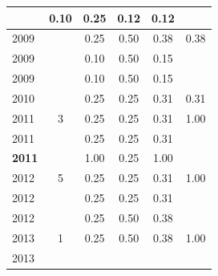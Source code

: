 \begin{table}[H]
\begin{tabular}{| l | c | c | c | c | c |}
          &
          0.10
          &
          0.25
          &
          0.12
          &
            {\color{red} 0.12}
          \\
\hline
            2009
          &
          
          &
          0.25
          &
          0.50
          &
          0.38
          &
            {\color{red} 0.38}
          \\
            2009
          &
          
          &
          0.10
          &
          0.50
          &
          0.15
          &
          \\
            2009
          &
          
          &
          0.10
          &
          0.50
          &
          0.15
          &
          \\
\hline
            2010
          &
          
          &
          0.25
          &
          0.25
          &
          0.31
          &
            {\color{red} 0.31}
          \\
\hline
            2011
          &
          3
          &
          0.25
          &
          0.25
          &
          0.31
          &
            {\color{blue} 1.00}
          \\
            2011
          &
          
          &
          0.25
          &
          0.25
          &
          0.31
          &
          \\
            {\bf 2011}
          &
          
          &
          1.00
          &
          0.25
          &
          1.00
          &
          \\
\hline
            2012
          &
          5
          &
          0.25
          &
          0.25
          &
          0.31
          &
            {\color{blue} 1.00}
          \\
            2012
          &
          
          &
          0.25
          &
          0.25
          &
          0.31
          &
          \\
            2012
          &
          
          &
          0.25
          &
          0.50
          &
          0.38
          &
          \\
\hline
            2013
          &
          1
          &
          0.25
          &
          0.50
          &
          0.38
          &
            {\color{blue} 1.00}
          \\
            2013
          &
          

\end{tabular}
\end{table}
